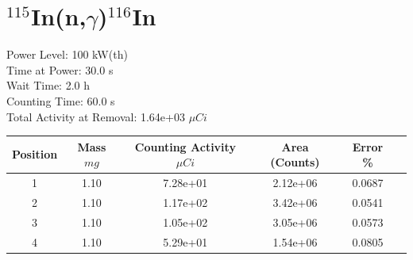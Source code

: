 \newpage

\section*{ $^{115}$In(n,$\gamma$)$^{116}$In }

Power Level: 100 kW(th) \\
Time at Power: 30.0 s \\
Wait Time:  2.0 h \\
Counting Time: 60.0 s \\
Total Activity at Removal: 1.64e+03 $\mu Ci$

\begin{table}[h]
\centering
\begin{tabular}{ |c|c|c|c|c|c| }
 \hline
 Position & Mass $mg$ & Counting Activity $\mu Ci$ & Area (Counts) & Error \% \\
 \hline 
 1 & 1.10 & 7.28e+01 & 2.12e+06 & 0.0687 \\ 
\hline
 2 & 1.10 & 1.17e+02 & 3.42e+06 & 0.0541 \\ 
\hline
 3 & 1.10 & 1.05e+02 & 3.05e+06 & 0.0573 \\ 
\hline
 4 & 1.10 & 5.29e+01 & 1.54e+06 & 0.0805 \\ 
\hline
\end{tabular}
\end{table}

